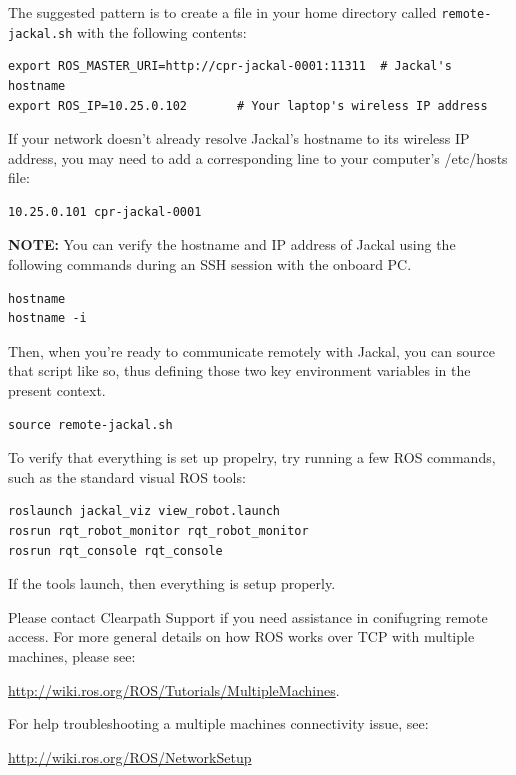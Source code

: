 \documentclass[]{clearpath-latex/clearpath-manual}
\begin{document}
The suggested pattern is to create a file in your home directory called \lstinline{remote-jackal.sh} with the following contents:

\begin{lstlisting}
export ROS_MASTER_URI=http://cpr-jackal-0001:11311  # Jackal's hostname
export ROS_IP=10.25.0.102       # Your laptop's wireless IP address
\end{lstlisting}

If your network doesn’t already resolve Jackal’s hostname to its wireless IP address, you may need to add a corresponding line to your computer’s /etc/hosts file:

\begin{lstlisting}
10.25.0.101 cpr-jackal-0001
\end{lstlisting}

\textbf{NOTE:} You can verify the hostname and IP address of Jackal using the following commands during an SSH session with the onboard PC.

\begin{lstlisting}
hostname
hostname -i
\end{lstlisting}

Then, when you’re ready to communicate remotely with Jackal, you can source that script like so, thus defining those two key environment variables in the present context.

\begin{lstlisting}
source remote-jackal.sh
\end{lstlisting}

To verify that everything is set up propelry, try running a few ROS commands, such as the standard visual ROS tools:

\begin{lstlisting}
roslaunch jackal_viz view_robot.launch
rosrun rqt_robot_monitor rqt_robot_monitor
rosrun rqt_console rqt_console
\end{lstlisting}

If the tools launch, then everything is setup properly.

Please contact Clearpath Support if you need assistance in conifugring remote access. For more general details on how ROS works over TCP with multiple machines, please see:

\url{http://wiki.ros.org/ROS/Tutorials/MultipleMachines}.

For help troubleshooting a multiple machines connectivity issue, see:

\url{http://wiki.ros.org/ROS/NetworkSetup}
\end{document}
